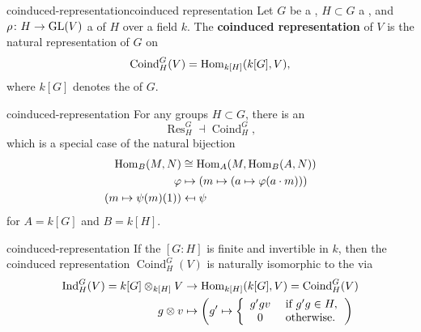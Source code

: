 \begin{topic}{coinduced-representation}{coinduced representation}
    Let $G$ be a , $H \subset G$ a , and $\rho \colon H \to \textup{GL}(V)$ a  of $H$ over a field $k$. The \textbf{coinduced representation} of $V$ is the natural representation of $G$ on
    \[ \operatorname{Coind}_H^G(V) = \operatorname{Hom}_{k[H]}(k[G], V) , \]
    where $k[G]$ denotes the  of $G$.
\end{topic}

\begin{example}{coinduced-representation}
    For any groups $H \subset G$, there is an 
    \[ \operatorname{Res}_H^G \dashv \operatorname{Coind}_H^G , \]
    which is a special case of the natural bijection
    \[ \begin{aligned}
        \operatorname{Hom}_B(M, N) &\cong \operatorname{Hom}_A(M, \operatorname{Hom}_B(A, N)) \\
        \varphi &\mapsto (m \mapsto (a \mapsto \varphi(a \cdot m))) \\
        (m \mapsto \psi(m)(1)) &\mapsfrom \psi
    \end{aligned} \]
    for $A = k[G]$ and $B = k[H]$.
\end{example}

\begin{example}{coinduced-representation}
    If the  $[G : H]$ is finite and invertible in $k$, then the coinduced representation $\operatorname{Coind}_H^G(V)$ is naturally isomorphic to the  via
    \[ \begin{aligned}
        \operatorname{Ind}_H^G(V) = k[G] \otimes_{k[H]} V &\to \operatorname{Hom}_{k[H]}(k[G], V) = \operatorname{Coind}_H^G(V) \\
        g \otimes v &\mapsto \left(g' \mapsto \left\{ \begin{array}{cl} g'g v & \textup{ if } g'g \in H, \\ 0 & \textup{ otherwise}. \end{array} \right. \right)
    \end{aligned} \]
\end{example}

